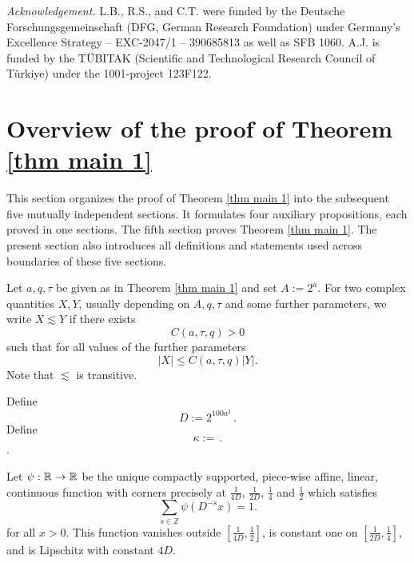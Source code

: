 \noindent \textit{Acknowledgement.}
L.B., R.S., and C.T. were funded by the Deutsche Forschungsgemeinschaft (DFG, German Research Foundation) under Germany's Excellence Strategy -- EXC-2047/1 -- 390685813 as well as SFB 1060.
A.J. is funded by the T\"UBITAK (Scientific and Technological Research Council of T\"urkiye) under the 1001-project 123F122.

\chapter{Overview of the proof of Theorem \ref{thm main 1}}
\label{overviewsection}


This section organizes the proof of Theorem
\ref{thm main 1} into the subsequent five
mutually independent sections.
It formulates four auxiliary propositions, each proved
    in one sections. The fifth section proves Theorem \ref{thm main 1}.
The present section  also introduces all definitions and statements used across boundaries of these five sections.


Let $a, q, \tau$ be given as in Theorem \ref{thm main 1}
and set $A:=2^a$.
For two complex quantities $X,Y$, usually depending on
$A, q, \tau$ and some further parameters,
we write $X\lesssim Y$ if there exists
    \[C(a,\tau,q)>0\]
such that for all values of the further parameters
\[|X|\le C(a,\tau,q)|Y|.\] Note that $\lesssim$ is transitive.



Define
\begin{equation}\label{defineD}
D:= 2^{100 a^2}\,  .
\end{equation}
Define
\begin{equation}\label{definekappa}
\kappa:= \,  .
\end{equation}
.

Let
    $\psi:\mathbb{R} \to \mathbb{R}$ be the unique compactly supported, piece-wise affine, linear, continuous function with corners precisely at $\frac 1{4D}$, $\frac 1{2D}$, $\frac 14$ and $\frac 12$ which satisfies
    \begin{equation}
    \label{eq psisum}
    \sum_{s\in \mathbb{Z}} \psi(D^{-s}x)=1 .
\end{equation}
for all  $x>0$. This function vanishes outside $[\frac1{4D},\frac 12]$, is constant one on
$[\frac1{2D},\frac 14]$, and is Lipschitz
with constant $4D$.







